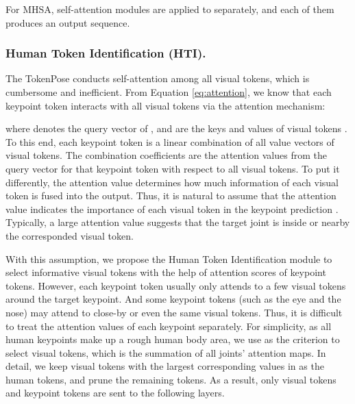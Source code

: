 \documentclass[runningheads]{llncs}
\begin{document}
For MHSA,  self-attention modules are applied to  separately, and each of them produces an output sequence. 





\subsubsection{Human Token Identification (HTI). }
The TokenPose \cite{li2021tokenpose} conducts self-attention among all visual tokens, which is cumbersome and inefficient. 
From Equation \ref{eq:attention}, we know that each keypoint token  interacts with all visual tokens  via the attention mechanism: 

where  denotes the query vector of ,  and  are the keys and values of visual tokens . 
To this end, each keypoint token is a linear combination of all value vectors of visual tokens. The combination coefficients  are the attention values from the query vector for that keypoint token with respect to all visual tokens. 
To put it differently, the attention value determines how much information of each visual token is fused into the output. 
Thus, it is natural to assume that the attention value  indicates the importance of each visual token in the keypoint prediction \cite{liang2022evit}. Typically, a large attention value suggests that the target joint is inside or nearby the corresponded visual token. 


With this assumption, we propose the Human Token Identification module to select informative visual tokens with the help of attention scores of keypoint tokens. 
However, each keypoint token usually only attends to a few visual tokens around the target keypoint. And some keypoint tokens (such as the eye and the nose) may attend to close-by or even the same visual tokens. Thus, it is difficult to treat the attention values of each keypoint separately. 
For simplicity, as all human keypoints make up a rough human body area, we use  as the criterion to select visual tokens, which is the summation of all joints' attention maps. 
In detail, we keep visual tokens with the  largest corresponding values in  as the human tokens, and prune the remaining tokens. As a result, only  visual tokens and  keypoint tokens are sent to the following layers. 
\end{document}
